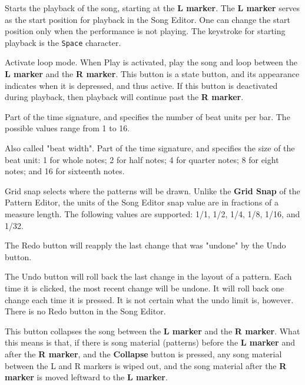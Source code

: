   Starts the playback of the song, starting at the \textbf{L marker}.
   The \textbf{L marker} serves as the start position for playback
   in the Song Editor.  One can change the start position only when the
   performance is not playing.
   The keystroke for starting playback is the \texttt{Space} character.

   Activate loop mode. When Play is activated,  play the song and loop
   between the
   \textbf{L marker} and the \textbf{R marker}.
   This button is a state button, and its appearance indicates when it is
   depressed, and thus active.
   If this button is deactivated during playback, then playback will
   continue past the \textbf{R marker}.

   Part of the time signature, and specifies the number of beat units per bar.
   The possible values range from 1 to 16.

   Also called "beat width".
   Part of the time signature, and specifies the size of the beat unit:
   1 for whole notes; 2 for half notes; 4 for quarter notes; 8 for eight notes;
   and 16 for sixteenth notes.

   Grid snap selects where the patterns will be drawn.
   Unlike the \textbf{Grid Snap} of the Pattern Editor, the units
   of the Song Editor snap value are in fractions of a measure length.
   The following values are supported:
   1/1, 1/2, 1/4, 1/8, 1/16, and 1/32.

   The Redo button will reapply the last change that was "undone" by
   the Undo button.

   The Undo button will roll back the last change in the layout of a
   pattern.  Each time it is clicked, the most recent change will be undone.
   It will roll back one change each time it is pressed.
   It is not certain what the undo limit is, however.
   There is no Redo button in the Song Editor.

   This button collapses the song between the \textbf{L marker} and the
   \textbf{R marker}.
   What this means is that, if there is song material (patterns) before the
   \textbf{L marker} and after the \textbf{R marker},
   and the \textbf{Collapse} button is
   pressed, any song material between the L and R markers is wiped out, and
   the song material after the \textbf{R marker} is moved leftward to
   the \textbf{L marker}.

